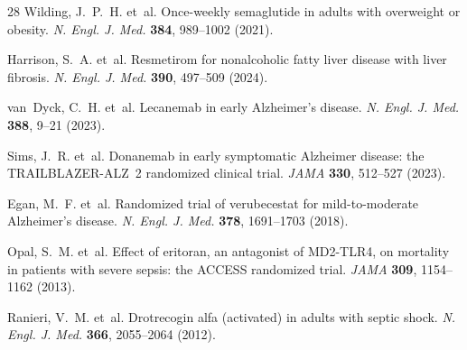 \documentclass[11pt,a4paper]{article}
\begin{document}
\begin{thebibliography}{28}
Wilding, J.~P.~H. et~al.
\newblock Once-weekly semaglutide in adults with overweight or obesity.
\newblock \emph{N. Engl. J. Med.} \textbf{384}, 989--1002 (2021).

Harrison, S.~A. et~al.
\newblock Resmetirom for nonalcoholic fatty liver disease with liver fibrosis.
\newblock \emph{N. Engl. J. Med.} \textbf{390}, 497--509 (2024).

van~Dyck, C.~H. et~al.
\newblock Lecanemab in early Alzheimer's disease.
\newblock \emph{N. Engl. J. Med.} \textbf{388}, 9--21 (2023).

Sims, J.~R. et~al.
\newblock Donanemab in early symptomatic Alzheimer disease: the TRAILBLAZER-ALZ~2 randomized clinical trial.
\newblock \emph{JAMA} \textbf{330}, 512--527 (2023).

Egan, M.~F. et~al.
\newblock Randomized trial of verubecestat for mild-to-moderate Alzheimer's disease.
\newblock \emph{N. Engl. J. Med.} \textbf{378}, 1691--1703 (2018).

Opal, S.~M. et~al.
\newblock Effect of eritoran, an antagonist of MD2-TLR4, on mortality in patients with severe sepsis: the ACCESS randomized trial.
\newblock \emph{JAMA} \textbf{309}, 1154--1162 (2013).

Ranieri, V.~M. et~al.
\newblock Drotrecogin alfa (activated) in adults with septic shock.
\newblock \emph{N. Engl. J. Med.} \textbf{366}, 2055--2064 (2012).

\end{thebibliography}
\end{document}
